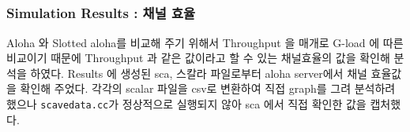 \vspace{-6mm}
\subsection{}
\vspace{-2mm}
\subsubsection{Simulation Results : 채널 효율}
\vspace{-2mm}
    Aloha 와 Slotted aloha를 비교해 주기 위해서 Throughput 을 매개로 G-load 에 따른 비교이기 때문에 Throughput 과 같은 값이라고 할 수 있는 채널효율의 값을 확인해 분석을 하였다.
    Results 에 생성된 sca, 스칼라 파일로부터 aloha server에서 채널 효율값을 확인해 주었다. 
    각각의 scalar 파일을 csv로 변환하여 직접 graph를 그려 분석하려 했으나 \texttt{scavedata.cc}가 정상적으로 실행되지 않아 sca 에서 직접 확인한 값을 캡처했다.
\vspace{-2mm} 
